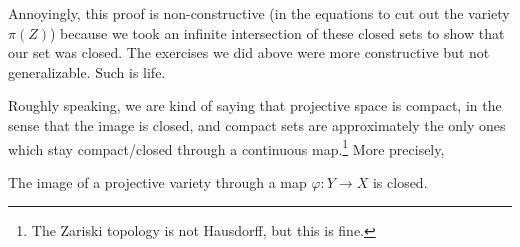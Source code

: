 \documentclass[../notes.tex]{subfiles}
\begin{document}
\begin{remark}
	Annoyingly, this proof is non-constructive (in the equations to cut out the variety $\pi(Z)$) because we took an infinite intersection of these closed sets to show that our set was closed. The exercises we did above were more constructive but not generalizable. Such is life.
\end{remark}

Roughly speaking, we are kind of saying that projective space is compact, in the sense that the image is closed, and compact sets are approximately the only ones which stay compact/closed through a continuous map.\footnote{The Zariski topology is not Hausdorff, but this is fine.} More precisely, 
\begin{corollary}
	The image of a projective variety through a map $\varphi\colon Y\to X$ is closed.
\end{corollary}
\end{document}
